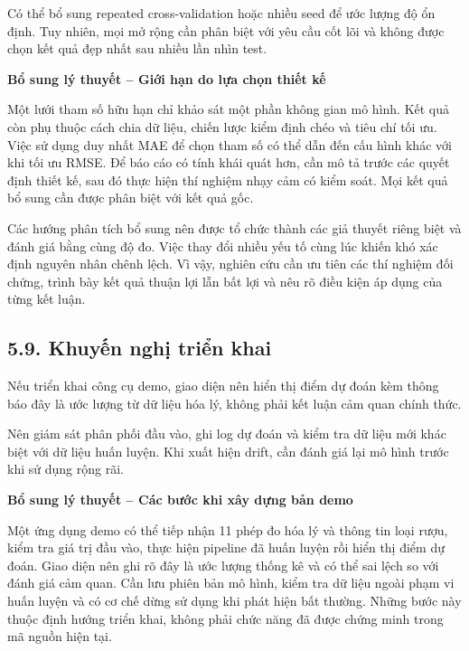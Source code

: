 \documentclass[12pt,a4paper,oneside]{article}
\begin{document}
Có thể bổ sung repeated cross-validation hoặc nhiều seed để ước lượng độ
ổn định. Tuy nhiên, mọi mở rộng cần phân biệt với yêu cầu cốt lõi và
không được chọn kết quả đẹp nhất sau nhiều lần nhìn test.


\par\noindent\textbf{Bổ sung lý thuyết -- Giới hạn do lựa chọn thiết kế}\par
Một lưới tham số hữu hạn chỉ khảo sát một phần không gian mô hình. Kết quả còn phụ thuộc cách chia dữ liệu, chiến lược kiểm định chéo và tiêu chí tối ưu. Việc sử dụng duy nhất MAE để chọn tham số có thể dẫn đến cấu hình khác với khi tối ưu RMSE. Để báo cáo có tính khái quát hơn, cần mô tả trước các quyết định thiết kế, sau đó thực hiện thí nghiệm nhạy cảm có kiểm soát. Mọi kết quả bổ sung cần được phân biệt với kết quả gốc.\par

Các hướng phân tích bổ sung nên được tổ chức thành các giả thuyết riêng biệt và đánh giá bằng cùng độ đo. Việc thay đổi nhiều yếu tố cùng lúc khiến khó xác định nguyên nhân chênh lệch. Vì vậy, nghiên cứu cần ưu tiên các thí nghiệm đối chứng, trình bày kết quả thuận lợi lẫn bất lợi và nêu rõ điều kiện áp dụng của từng kết luận.\par

\subsection*{5.9. Khuyến nghị triển khai}

Nếu triển khai công cụ demo, giao diện nên hiển thị điểm dự đoán kèm
thông báo đây là ước lượng từ dữ liệu hóa lý, không phải kết luận cảm
quan chính thức.

Nên giám sát phân phối đầu vào, ghi log dự đoán và kiểm tra dữ liệu mới
khác biệt với dữ liệu huấn luyện. Khi xuất hiện drift, cần đánh giá lại
mô hình trước khi sử dụng rộng rãi.


\par\noindent\textbf{Bổ sung lý thuyết -- Các bước khi xây dựng bản demo}\par
Một ứng dụng demo có thể tiếp nhận 11 phép đo hóa lý và thông tin loại rượu, kiểm tra giá trị đầu vào, thực hiện pipeline đã huấn luyện rồi hiển thị điểm dự đoán. Giao diện nên ghi rõ đây là ước lượng thống kê và có thể sai lệch so với đánh giá cảm quan. Cần lưu phiên bản mô hình, kiểm tra dữ liệu ngoài phạm vi huấn luyện và có cơ chế dừng sử dụng khi phát hiện bất thường. Những bước này thuộc định hướng triển khai, không phải chức năng đã được chứng minh trong mã nguồn hiện tại.\par
\end{document}
